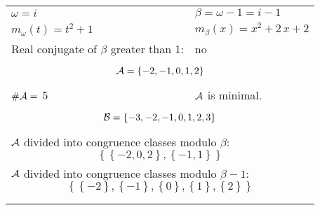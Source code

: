 \begin{exmp}
\label{ex:compareAF}


\rule{0cm}{0cm}

\begin{tabular}{ll}
$\omega=  i $  & $\beta= \omega - 1 = i - 1 $\\
$m_\omega(t)=  t^{2} + 1 $  & $m_\beta(x)=  x^{2} + 2 \, x + 2 $\\
Real conjugate of $\beta$ greater than 1:   &  no \\ \hline
\multicolumn{2}{l}{\begin{minipage}{\textwidth}\begin{dmath*}\A = \left\{-2, -1, 0, 1, 2\right\}  \end{dmath*}\end{minipage} }\\
$\#\mathcal{A}= $ 5 $ $ & $\mathcal{A}$ is minimal. \\
\multicolumn{2}{l}{\begin{minipage}{\textwidth}\begin{dmath*}\B = \left\{-3, -2, -1, 0, 1, 2, 3\right\}  \end{dmath*}\end{minipage} }\\[10pt]
\multicolumn{2}{l}{\begin{minipage}{\textwidth}$\mathcal{A}$ divided into congruence classes modulo $\beta$: \begin{dmath*} \left\{\left\{-2, 0, 2\right\}, \left\{-1, 1\right\}\right\}  \end{dmath*}\end{minipage} }\\[10pt]
\multicolumn{2}{l}{\begin{minipage}{\textwidth}$\mathcal{A}$ divided into congruence classes modulo $\beta-1$: \begin{dmath*} \left\{\left\{-2\right\}, \left\{-1\right\}, \left\{0\right\}, \left\{1\right\}, \left\{2\right\}\right\}  \end{dmath*}\end{minipage} }\\
 & \\ \hline
 & \\
\end{tabular}


\end{exmp}

